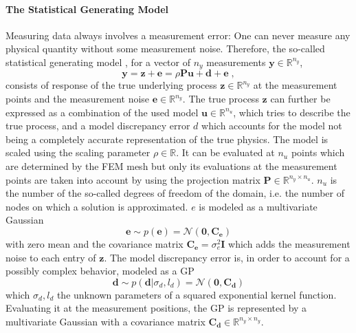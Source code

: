 \documentclass[%
  a4paper,oneside,%
  11pt,%
  smallchapters,
  style=printdev,
  extramargin,
  green,%
  rgb, <cmyk>
  ]{tubsbook}
\begin{document}
\paragraph{The Statistical Generating Model}
Measuring data always involves a measurement error: One can never measure any physical quantity without some measurement noise. Therefore, the so-called statistical generating model \cite{girolami2021}, \cite{kennedy2001} for a vector of $n_y$ measurements $\bm{y} \in \mathbb{R}^{n_y}$, 
%
\begin{equation}
\bm{y} = \bm{z} + \bm{e} = \rho \bm{P} \bm{u} + \bm{d} + \bm{e} \; ,
\label{eqn:statGen}
\end{equation}
%
consists of response of the true underlying process $\bm{z} \in \mathbb{R}^{n_y}$ at the measurement points and the measurement noise $\bm{e} \in \mathbb{R}^{n_y}$. The true process $\bm{z}$ can further be expressed as a combination of the used model $\bm{u} \in \mathbb{R}^{n_u}$, which tries to describe the true process, and a model discrepancy error $d$ which accounts for the model not being a completely accurate representation of the true physics. The model is scaled using the scaling parameter $\rho \in \mathbb{R}$. It can be evaluated at $n_u$ points which are determined by the FEM mesh but only its evaluations at the measurement points are taken into account by using the projection matrix $\bm{P} \in \mathbb{R}^{n_y \times n_u}$. $n_u$ is the number of the so-called degrees of freedom of the domain, i.e. the number of nodes on which a solution is approximated.
%
$e$ is modeled as a multivariate Gaussian 
%
\begin{equation}
\bm{e} \sim p(\bm{e}) = \mathcal{N}(\bm{0}, \bm{C_e})
\end{equation}
with zero mean and the covariance matrix $\bm{C_e} = \sigma_e^2 \bm{I}$ which adds the measurement noise to each entry of $\bm{z}$.
%
The model discrepancy error is, in order to account for a possibly complex behavior, modeled as a GP
\begin{equation}
\bm{d} \sim p(\bm{d} | \sigma_d, l_d) = \mathcal{N}(\bm{0},\bm{C_d})
\end{equation}
which $\sigma_d, l_d$ the unknown parameters of a squared exponential kernel function. Evaluating it at the measurement positions, the GP is represented by a multivariate Gaussian with a covariance matrix $\bm{C_d} \in \mathbb{R}^{n_y \times n_y}$.
\end{document}
